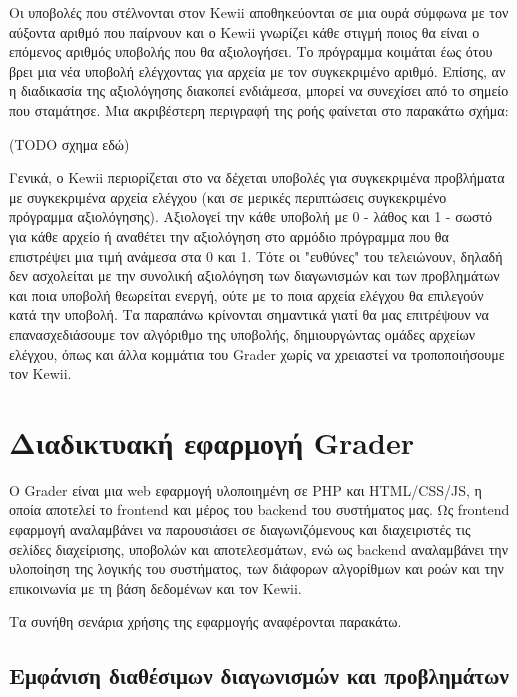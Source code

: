 \documentclass[diploma]{softlab-thesis}
\begin{document}
\bigskip

Οι υποβολές που στέλνονται στον Kewii αποθηκεύονται σε μια ουρά σύμφωνα με τον
αύξοντα αριθμό που παίρνουν και ο Kewii γνωρίζει κάθε στιγμή ποιος θα είναι ο
επόμενος αριθμός υποβολής που θα αξιολογήσει. Το πρόγραμμα κοιμάται έως ότου
βρει μια νέα υποβολή ελέγχοντας για αρχεία με τον συγκεκριμένο αριθμό. Επίσης,
αν η διαδικασία της αξιολόγησης διακοπεί ενδιάμεσα, μπορεί να συνεχίσει από το
σημείο που σταμάτησε. Μια ακριβέστερη περιγραφή της ροής φαίνεται στο παρακάτω
σχήμα:

(TODO σχημα εδώ)

\bigskip

Γενικά, ο Kewii περιορίζεται στο να δέχεται υποβολές για συγκεκριμένα προβλήματα
με συγκεκριμένα αρχεία ελέγχου (και σε μερικές περιπτώσεις συγκεκριμένο πρόγραμμα
αξιολόγησης). Αξιολογεί την κάθε υποβολή με 0 - λάθος και 1 - σωστό για κάθε αρχείο
ή αναθέτει την αξιολόγηση στο αρμόδιο πρόγραμμα που θα επιστρέψει μια τιμή ανάμεσα
στα 0 και 1. Τότε οι "ευθύνες" του τελειώνουν, δηλαδή δεν ασχολείται με την συνολική
αξιολόγηση των διαγωνισμών και των προβλημάτων και ποια υποβολή θεωρείται ενεργή,
ούτε με το ποια αρχεία ελέγχου θα επιλεγούν κατά την υποβολή. Τα παραπάνω κρίνονται
σημαντικά γιατί θα μας επιτρέψουν να επανασχεδιάσουμε τον αλγόριθμο της υποβολής,
δημιουργώντας ομάδες αρχείων ελέγχου, όπως και άλλα κομμάτια του Grader χωρίς να
χρειαστεί να τροποποιήσουμε τον Kewii.

\section{Διαδικτυακή εφαρμογή Grader}

Ο Grader είναι μια web εφαρμογή υλοποιημένη σε PHP και HTML/CSS/JS, η οποία αποτελεί
το frontend και μέρος του backend του συστήματος μας. Ως frontend εφαρμογή
αναλαμβάνει να παρουσιάσει σε διαγωνιζόμενους και διαχειριστές τις σελίδες
διαχείρισης, υποβολών και αποτελεσμάτων, ενώ ως backend αναλαμβάνει την υλοποίηση της
λογικής του συστήματος, των διάφορων αλγορίθμων και ροών και την επικοινωνία με τη
βάση δεδομένων και τον Kewii.

\bigskip

\noindent Τα συνήθη σενάρια χρήσης της εφαρμογής αναφέρονται παρακάτω.

\subsection{Εμφάνιση διαθέσιμων διαγωνισμών και προβλημάτων}
\end{document}
